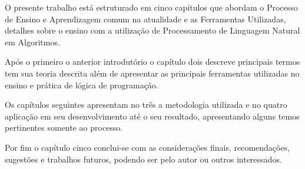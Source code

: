 \ifdraft{\color{green}}{}O presente trabalho está estruturado em cinco capítulos que abordam o Processo de Ensino e Aprendizagem comum na atualidade e as Ferramentas Utilizadas, detalhes sobre o ensino com a utilização de Processamento de Linguagem Natural em Algoritmos.

Após o primeiro o anterior introdutório o capítulo dois descreve principais termos tem sua teoria descrita além de apresentar as principais ferramentas utilizadas no ensino e prática de lógica de programação.

Os capítulos seguintes apresentam no três a metodologia utilizada e no quatro aplicação em seu desenvolvimento até o seu resultado, apresentando alguns temos pertinentes somente ao processo.

Por fim o capítulo cinco conclui-se com as considerações finais, recomendações, sugestões e trabalhos futuros, podendo ser pelo autor ou outros interessados.\color{black}

